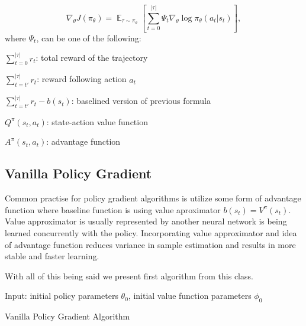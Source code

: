 \[
  \nabla_\theta J(\pi_\theta) = \mathop{\mathbb{E}}_{\tau \sim \pi_\theta}\left[\sum_{t=0}^{|\tau|} \Psi_t \nabla_\theta \log \pi_\theta(a_t|s_t)\right],
\]
where $\Psi_t$, can be one of the following:
\begin{list}{}{}
  \item $\sum_{t=0}^{|\tau|} r_t$: total reward of the trajectory
  \item $\sum_{t=t'}^{|\tau|} r_t$: reward following action $a_t$
  \item $\sum_{t=t'}^{|\tau|} r_t - b(s_t)$: baselined version of previous formula
  \item $Q^\pi(s_t,a_t)$: state-action value function
  \item $A^\pi(s_t,a_t)$: advantage function
\end{list}

\subsection{Vanilla Policy Gradient}
Common practise for policy gradient algorithms is utilize some form of advantage function where baseline function is using value aproximator $b(s_t) = V^\pi(s_t)$.
Value approximator is usually represented by another neural network is being learned concurrently with the policy.
Incorporating value approximator and idea of advantage function reduces variance in sample estimation and results in more stable and faster learning.

With all of this being said we present first algorithm from this class.

\begin{algorithm}[H]
  Input: initial policy parameters $\theta_0$, initial value function parameters $\phi_0$
  
  
  \caption{Vanilla Policy Gradient Algorithm}
  \label{Vanilla}
\end{algorithm}

